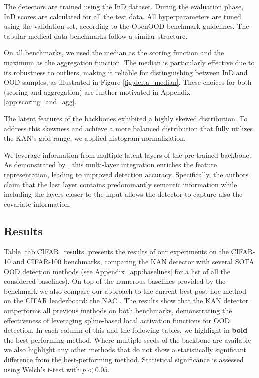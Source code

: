 The detectors are trained using the InD dataset. 
During the evaluation phase, InD scores are calculated for all the test data. 
All hyperparameters are tuned using the validation set, according to the OpenOOD benchmark guidelines. 
The tabular medical data benchmarks follow a similar structure.

On all benchmarks, we used the median as the scoring function and the maximum as the aggregation function.
The median is particularly effective due to its robustness to outliers, making it reliable for distinguishing between InD and OOD samples, as illustrated in Figure \ref{fig:delta_median}. 
These choices for both (scoring and aggregation) are further motivated in Appendix \ref{app:scoring_and_agg}.

The latent features of the backbones exhibited a highly skewed distribution. To address this skewness and achieve a more balanced distribution that fully utilizes the KAN's grid range, we applied histogram normalization.

We leverage information from multiple latent layers of the pre-trained backbone. 
As demonstrated by \citet{liu2024neuron}, this multi-layer integration enriches the feature representation, leading to improved detection accuracy. Specifically, the authors claim that the last layer contains predominantly semantic information while including the layers closer to the input allows the detector to capture also the covariate information.

\subsection{Results}
\label{sec:results}

Table \ref{tab:CIFAR_results} presents the results of our experiments on the CIFAR-10 and CIFAR-100 benchmarks, comparing the KAN detector with several SOTA OOD detection methods (see Appendix~\ref{app:baselines} for a list of all the considered baselines). 
On top of the numerous baselines provided by the benchmark we also compare our approach to the current best post-hoc method on the CIFAR leaderboard: the NAC \citep{liu2024neuron}.
The results show that the KAN detector outperforms all previous methods on both benchmarks, demonstrating the effectiveness of leveraging spline-based local activation functions for OOD detection.
In each column of this and the following tables, we highlight in \textbf{bold} the best-performing method. Where multiple seeds of the backbone are available we also highlight any other methods that do not show a statistically significant difference from the best-performing method. 
Statistical significance is assessed using Welch's t-test with $p<0.05$.

